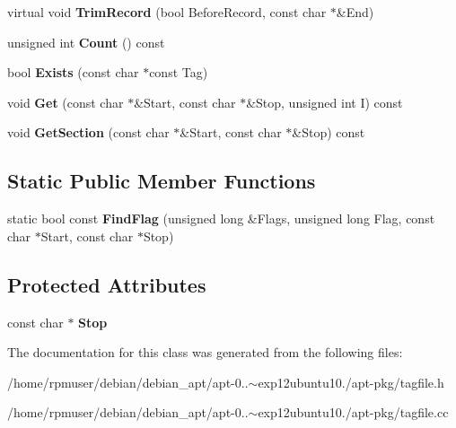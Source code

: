 \begin{DoxyCompactItemize}
\item 
virtual void {\bfseries \-Trim\-Record} (bool \-Before\-Record, const char $\ast$\&\-End)\label{classpkgTagSection_a98566412c061bc3b5b2a8f3470ac6df6}

\item 
unsigned int {\bfseries \-Count} () const \label{classpkgTagSection_a074f9905a87bb9395d21d9f4bc8c459f}

\item 
bool {\bfseries \-Exists} (const char $\ast$const \-Tag)\label{classpkgTagSection_a9e61e13a04ea941007359fc64abaf7e3}

\item 
void {\bfseries \-Get} (const char $\ast$\&\-Start, const char $\ast$\&\-Stop, unsigned int \-I) const \label{classpkgTagSection_af94ab9ae460b12528eff3db24cd1aec9}

\item 
void {\bfseries \-Get\-Section} (const char $\ast$\&\-Start, const char $\ast$\&\-Stop) const \label{classpkgTagSection_a860dc38cfe63d7d9938d4d4dfca89712}

\end{DoxyCompactItemize}
\subsection*{\-Static \-Public \-Member \-Functions}
\begin{DoxyCompactItemize}
\item 
static bool const {\bfseries \-Find\-Flag} (unsigned long \&\-Flags, unsigned long \-Flag, const char $\ast$\-Start, const char $\ast$\-Stop)\label{classpkgTagSection_ac0d8827aa999c7648073f8d708ce746d}

\end{DoxyCompactItemize}
\subsection*{\-Protected \-Attributes}
\begin{DoxyCompactItemize}
\item 
const char $\ast$ {\bfseries \-Stop}\label{classpkgTagSection_a3ea16eea806200f4a86b79bb81fc66cc}

\end{DoxyCompactItemize}


\-The documentation for this class was generated from the following files\-:\begin{DoxyCompactItemize}
\item 
/home/rpmuser/debian/debian\-\_\-apt/apt-\/0..$\sim$exp12ubuntu10./apt-\/pkg/tagfile.\-h\item 
/home/rpmuser/debian/debian\-\_\-apt/apt-\/0..$\sim$exp12ubuntu10./apt-\/pkg/tagfile.\-cc\end{DoxyCompactItemize}
